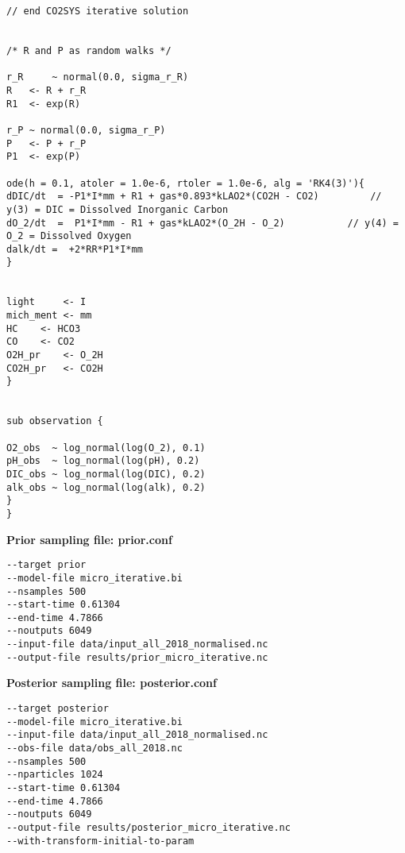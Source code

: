 \documentclass{ruthesis}
\begin{document}
\begin{verbatim}
// end CO2SYS iterative solution


/* R and P as random walks */

r_R 	~ normal(0.0, sigma_r_R)
R 	<- R + r_R
R1 	<- exp(R)

r_P ~ normal(0.0, sigma_r_P)
P 	<- P + r_P
P1 	<- exp(P)

ode(h = 0.1, atoler = 1.0e-6, rtoler = 1.0e-6, alg = 'RK4(3)'){
dDIC/dt  = -P1*I*mm + R1 + gas*0.893*kLAO2*(CO2H - CO2)  		// y(3) = DIC = Dissolved Inorganic Carbon 
dO_2/dt	 =  P1*I*mm - R1 + gas*kLAO2*(O_2H - O_2)	 		// y(4) = O_2 = Dissolved Oxygen 
dalk/dt =  +2*RR*P1*I*mm
}


light 	  <- I
mich_ment <- mm
HC	  <- HCO3
CO	  <- CO2
O2H_pr 	  <- O_2H
CO2H_pr   <- CO2H
}


sub observation {

O2_obs  ~ log_normal(log(O_2), 0.1)
pH_obs  ~ log_normal(log(pH), 0.2)
DIC_obs ~ log_normal(log(DIC), 0.2) 
alk_obs ~ log_normal(log(alk), 0.2)
}
}
\end{verbatim}

\textbf{Prior sampling file: prior.conf}
\begin{verbatim}
--target prior
--model-file micro_iterative.bi
--nsamples 500
--start-time 0.61304
--end-time 4.7866
--noutputs 6049
--input-file data/input_all_2018_normalised.nc
--output-file results/prior_micro_iterative.nc
\end{verbatim}

\textbf{Posterior sampling file: posterior.conf}
\begin{verbatim}
--target posterior
--model-file micro_iterative.bi
--input-file data/input_all_2018_normalised.nc
--obs-file data/obs_all_2018.nc
--nsamples 500
--nparticles 1024
--start-time 0.61304
--end-time 4.7866
--noutputs 6049
--output-file results/posterior_micro_iterative.nc
--with-transform-initial-to-param
\end{verbatim}




{}


%
%
\end{document}
